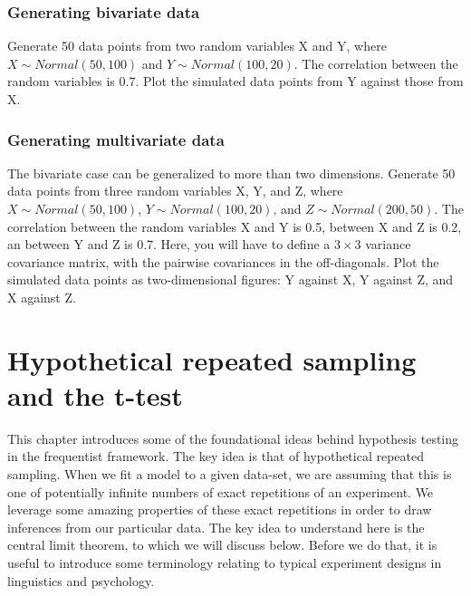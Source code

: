 \documentclass[12pt,]{krantz}
\begin{document}
\hypertarget{sec:Foundationsexercisesbivar}{%
\subsection{Generating bivariate data}\label{sec:Foundationsexercisesbivar}}

Generate 50 data points from two random variables X and Y, where \(X\sim Normal(50,100)\) and \(Y\sim Normal(100,20)\). The correlation between the random variables is 0.7. Plot the simulated data points from Y against those from X.

\hypertarget{sec:Foundationsexercisesmultivar}{%
\subsection{Generating multivariate data}\label{sec:Foundationsexercisesmultivar}}

The bivariate case can be generalized to more than two dimensions.
Generate 50 data points from three random variables X, Y, and Z, where \(X\sim Normal(50,100)\), \(Y\sim Normal(100,20)\), and \(Z\sim Normal(200,50)\). The correlation between the random variables X and Y is 0.5, between X and Z is 0.2, an between Y and Z is 0.7. Here, you will have to define a \(3\times 3\) variance covariance matrix, with the pairwise covariances in the off-diagonals. Plot the simulated data points as two-dimensional figures: Y against X, Y against Z, and X against Z.

\hypertarget{hypothetical-repeated-sampling-and-the-t-test}{%
\chapter{Hypothetical repeated sampling and the t-test}\label{hypothetical-repeated-sampling-and-the-t-test}}

This chapter introduces some of the foundational ideas behind hypothesis testing in the frequentist framework. The key idea is that of hypothetical repeated sampling. When we fit a model to a given data-set, we are assuming that this is one of potentially infinite numbers of exact repetitions of an experiment. We leverage some amazing properties of these exact repetitions in order to draw inferences from our particular data. The key idea to understand here is the central limit theorem, to which we will discuss below. Before we do that, it is useful to introduce some terminology relating to typical experiment designs in linguistics and psychology.
\end{document}
